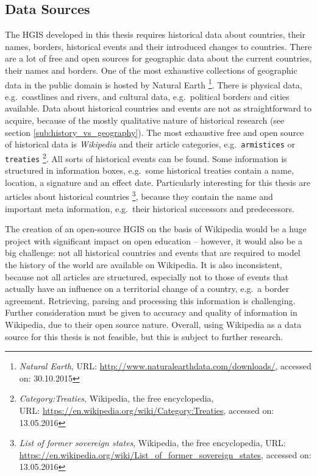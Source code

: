 
\subsection{Data Sources} %
\label{sub:data_sources}

The HGIS developed in this thesis requires historical data about countries, their names, borders, historical events and their introduced changes to countries. There are a lot of free and open sources for geographic data about the current countries, their names and borders. One of the most exhaustive collections of geographic data in the public domain is hosted by Natural Earth
\footnote{
  \textit{Natural Earth},
  URL: \url{http://www.naturalearthdata.com/downloads/},
  accessed on: 30.10.2015
}.
There is physical data, e.g.\ coastlines and rivers, and cultural data, e.g.\ political borders and cities available.
Data about historical countries and events are not as straightforward to acquire, because of the mostly qualitative nature of historical research (see section \ref{sub:history_vs_geography}). The most exhaustive free and open source of historical data is \emph{Wikipedia} and their article categories, e.g.\ \texttt{armistices} or \texttt{treaties}
\footnote{
  \textit{Category:Treaties},
  Wikipedia, the free encyclopedia,\\
  URL: \url{https://en.wikipedia.org/wiki/Category:Treaties},
  accessed on: 13.05.2016
}.
All sorts of historical events can be found. Some information is structured in information boxes, e.g.\ some historical treaties contain a name, location, a signature and an effect date. Particularly interesting for this thesis are articles about historical countries
\footnote{
  \textit{List of former sovereign states},
  Wikipedia, the free encyclopedia,
  URL: \url{https://en.wikipedia.org/wiki/List_of_former_sovereign_states},
  accessed on: 13.05.2016
},
because they contain the name and important meta information, e.g.\ their historical successors and predecessors.

The creation of an open-source HGIS on the basis of Wikipedia would be a huge project with significant impact on open education -- however, it would also be a big challenge: not all historical countries and events that are required to model the history of the world are available on Wikipedia. It is also inconsistent, because not all articles are structured, especially not to those of events that actually have an influence on a territorial change of a country, e.g.\ a border agreement. Retrieving, parsing and processing this information is challenging.
Further consideration must be given to accuracy and quality of information in Wikipedia, due to their open source nature.
Overall, using Wikipedia as a data source for this thesis is not feasible, but this is subject to further research.

